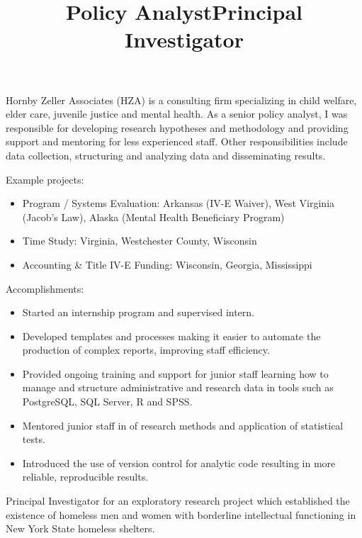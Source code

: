 \documentclass[line, margin, 10pt]{res}
\begin{document}
\begin{resume}
  \title{Policy Analyst}
  \begin{position}
    Hornby Zeller Associates (HZA) is a consulting firm specializing
    in child welfare, elder care, juvenile justice and mental
    health. As a senior policy analyst, I was responsible for
    developing research hypotheses and methodology and providing
    support and mentoring for less experienced staff. Other
    responsibilities include data collection, structuring and
    analyzing data and disseminating results.

    Example projects:
    \begin{itemize}
    \item Program / Systems Evaluation: Arkansas (IV-E Waiver), West
      Virginia (Jacob's Law), Alaska (Mental Health Beneficiary Program)
    \item Time Study: Virginia, Westchester County, Wisconsin
    \item Accounting \& Title IV-E Funding: Wisconsin, Georgia, Mississippi
    \end{itemize}

    Accomplishments:
    \begin{itemize}
    \item Started an internship program and supervised intern.
    \item Developed templates and processes making it easier to
      automate the production of complex reports, improving staff
      efficiency.
    \item Provided ongoing training and support for junior staff
      learning how to manage and structure administrative and research
      data in tools such as PostgreSQL, SQL Server, R and SPSS.
    \item Mentored junior staff in of research methods and application
      of statistical tests.
    \item Introduced the use of version control for analytic code
      resulting in more reliable, reproducible results.
    \end{itemize}
  \end{position}

  \title{Principal Investigator}
  \begin{position}
    Principal Investigator for an exploratory research project which
    established the existence of homeless men and women with
    borderline intellectual functioning in New York State homeless
    shelters.


\end{position}
\end{resume}
\end{document}
